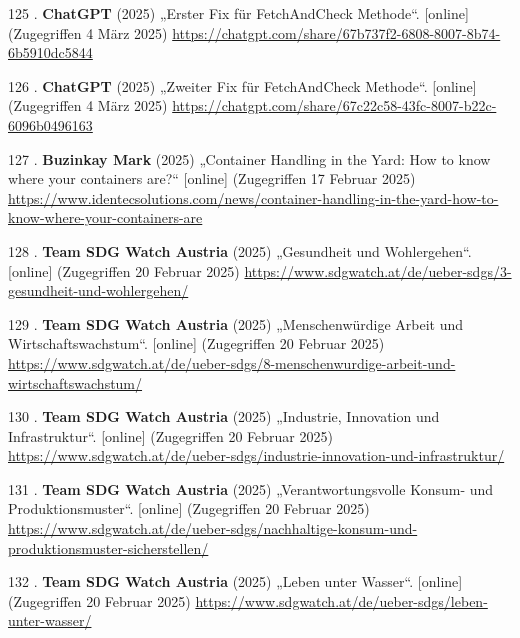 \documentclass[
    headings=optiontotocandhead,%
    twoside,
    numbers=noenddot,%
    12pt, %
    titlepage, %
    parskip=full, %
    listof=leveldown, 
    numbers=noenddot, %
    a4paper,DIV=14,
    BCOR=15mm,
]{scrbook}
\newcommand*{\authormark}{}
\newlength{\cslhangindent}
\newenvironment{cslreferences}%
  {\setlength{\parindent}{0pt}%
  \everypar{\setlength{\hangindent}{\cslhangindent}}\ignorespaces}%
  {\par}
\begin{document}
\begin{cslreferences}
\leavevmode\hypertarget{ref-gpt-FetchAndCheckFixEins}{}%
125 . \textbf{ChatGPT} (2025) „Erster Fix für FetchAndCheck Methode``.
{[}online{]} (Zugegriffen 4 März 2025)
\url{https://chatgpt.com/share/67b737f2-6808-8007-8b74-6b5910dc5844}

\leavevmode\hypertarget{ref-gpt-FetchAndCheckFixZwei}{}%
126 . \textbf{ChatGPT} (2025) „Zweiter Fix für FetchAndCheck Methode``.
{[}online{]} (Zugegriffen 4 März 2025)
\url{https://chatgpt.com/share/67c22c58-43fc-8007-b22c-6096b0496163}

\leavevmode\hypertarget{ref-identecsolutions}{}%
127 . \textbf{Buzinkay Mark} (2025) „Container Handling in the Yard: How
to know where your containers are?{}`` {[}online{]} (Zugegriffen 17
Februar 2025)
\url{https://www.identecsolutions.com/news/container-handling-in-the-yard-how-to-know-where-your-containers-are}

\leavevmode\hypertarget{ref-sdg3}{}%
128 . \textbf{Team SDG Watch Austria} (2025) „Gesundheit und
Wohlergehen``. {[}online{]} (Zugegriffen 20 Februar 2025)
\url{https://www.sdgwatch.at/de/ueber-sdgs/3-gesundheit-und-wohlergehen/}

\leavevmode\hypertarget{ref-sdg8}{}%
129 . \textbf{Team SDG Watch Austria} (2025) „Menschenwürdige Arbeit und
Wirtschafts­wachstum``. {[}online{]} (Zugegriffen 20 Februar 2025)
\url{https://www.sdgwatch.at/de/ueber-sdgs/8-menschenwurdige-arbeit-und-wirtschaftswachstum/}

\leavevmode\hypertarget{ref-sdg9}{}%
130 . \textbf{Team SDG Watch Austria} (2025) „Industrie, Innovation und
Infrastruktur``. {[}online{]} (Zugegriffen 20 Februar 2025)
\url{https://www.sdgwatch.at/de/ueber-sdgs/industrie-innovation-und-infrastruktur/}

\leavevmode\hypertarget{ref-sdg12}{}%
131 . \textbf{Team SDG Watch Austria} (2025) „Verantwortungs­volle
Konsum- und Produktions­muster``. {[}online{]} (Zugegriffen 20 Februar
2025)
\url{https://www.sdgwatch.at/de/ueber-sdgs/nachhaltige-konsum-und-produktionsmuster-sicherstellen/}

\leavevmode\hypertarget{ref-sdg14}{}%
132 . \textbf{Team SDG Watch Austria} (2025) „Leben unter Wasser``.
{[}online{]} (Zugegriffen 20 Februar 2025)
\url{https://www.sdgwatch.at/de/ueber-sdgs/leben-unter-wasser/}
\end{cslreferences}

\renewcommand{\authormark}{}%
\cleardoublepage{}

\end{document}
